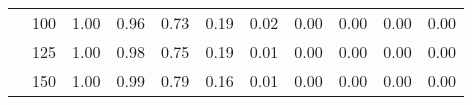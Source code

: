\begin{table}[t]
\begin{center}
\begin{subtable}[c]{\textwidth}
\begin{center}
\begin{tabular}{rcccccccccc}
                                        & \multicolumn{1}{c|}{100}  & \num{1.00}  & \num{0.96}  & \num{0.73}  & \num{0.19}  & \num{0.02}  & \num{0.00}  & \num{0.00}  & \num{0.00}  & \num{0.00}  \\
                                        & \multicolumn{1}{c|}{125}  & \num{1.00}  & \num{0.98}  & \num{0.75}  & \num{0.19}  & \num{0.01}  & \num{0.00}  & \num{0.00}  & \num{0.00}  & \num{0.00}  \\
                                        & \multicolumn{1}{c|}{150}  & \num{1.00}  & \num{0.99}  & \num{0.79}  & \num{0.16}  & \num{0.01}  & \num{0.00}  & \num{0.00}  & \num{0.00}  & \num{0.00}  \\
                                    \end{tabular}
            \end{center}
        \end{subtable}

        \vspace{5mm}


\end{center}
\end{table}
